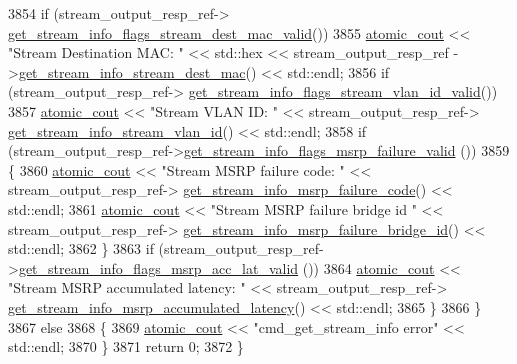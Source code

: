 \begin{DoxyCode}
3854             \textcolor{keywordflow}{if} (stream\_output\_resp\_ref->
      \hyperlink{classavdecc__lib_1_1stream__output__get__stream__info__response_a1089d406a845dc42da30dbb1cd627f09}{get\_stream\_info\_flags\_stream\_dest\_mac\_valid}())
3855                 \hyperlink{cmd__line_8h_a0bc38ccc65c79ba06c6fcd7b4bf554c3}{atomic\_cout} << \textcolor{stringliteral}{"Stream Destination MAC: "} << std::hex << stream\_output\_resp\_ref
      ->\hyperlink{classavdecc__lib_1_1stream__output__get__stream__info__response_a81e48c219d69340880c1698e196d644e}{get\_stream\_info\_stream\_dest\_mac}() << std::endl;
3856             \textcolor{keywordflow}{if} (stream\_output\_resp\_ref->
      \hyperlink{classavdecc__lib_1_1stream__output__get__stream__info__response_a3a361aef8a701f2684127d56b81c730a}{get\_stream\_info\_flags\_stream\_vlan\_id\_valid}())
3857                 \hyperlink{cmd__line_8h_a0bc38ccc65c79ba06c6fcd7b4bf554c3}{atomic\_cout} << \textcolor{stringliteral}{"Stream VLAN ID: "} << stream\_output\_resp\_ref->
      \hyperlink{classavdecc__lib_1_1stream__output__get__stream__info__response_a0f6668da1219c2499b298ef387179642}{get\_stream\_info\_stream\_vlan\_id}() << std::endl;
3858             \textcolor{keywordflow}{if} (stream\_output\_resp\_ref->\hyperlink{classavdecc__lib_1_1stream__output__get__stream__info__response_a66f8db5ffff809dc5ae3b96c8d43eaf5}{get\_stream\_info\_flags\_msrp\_failure\_valid}
      ())
3859             \{
3860                 \hyperlink{cmd__line_8h_a0bc38ccc65c79ba06c6fcd7b4bf554c3}{atomic\_cout} << \textcolor{stringliteral}{"Stream MSRP failure code: "} << stream\_output\_resp\_ref->
      \hyperlink{classavdecc__lib_1_1stream__output__get__stream__info__response_ac6de72a4fceb3b08ac797689cd04c213}{get\_stream\_info\_msrp\_failure\_code}() << std::endl;
3861                 \hyperlink{cmd__line_8h_a0bc38ccc65c79ba06c6fcd7b4bf554c3}{atomic\_cout} << \textcolor{stringliteral}{"Stream MSRP failure bridge id "} << stream\_output\_resp\_ref->
      \hyperlink{classavdecc__lib_1_1stream__output__get__stream__info__response_a8873569631d5d34b648931d4a669cbfe}{get\_stream\_info\_msrp\_failure\_bridge\_id}() << std::endl;
3862             \}
3863             \textcolor{keywordflow}{if} (stream\_output\_resp\_ref->\hyperlink{classavdecc__lib_1_1stream__output__get__stream__info__response_a54f69ff970809ded4916bb29b7945c14}{get\_stream\_info\_flags\_msrp\_acc\_lat\_valid}
      ())
3864                 \hyperlink{cmd__line_8h_a0bc38ccc65c79ba06c6fcd7b4bf554c3}{atomic\_cout} << \textcolor{stringliteral}{"Stream MSRP accumulated latency: "} << stream\_output\_resp\_ref->
      \hyperlink{classavdecc__lib_1_1stream__output__get__stream__info__response_ae4d4e7b9a2c69eb93fc7e277cc14a968}{get\_stream\_info\_msrp\_accumulated\_latency}() << std::endl;
3865         \}
3866     \}
3867     \textcolor{keywordflow}{else}
3868     \{
3869         \hyperlink{cmd__line_8h_a0bc38ccc65c79ba06c6fcd7b4bf554c3}{atomic\_cout} << \textcolor{stringliteral}{"cmd\_get\_stream\_info error"} << std::endl;
3870     \}
3871     \textcolor{keywordflow}{return} 0;
3872 \}
\end{DoxyCode}


